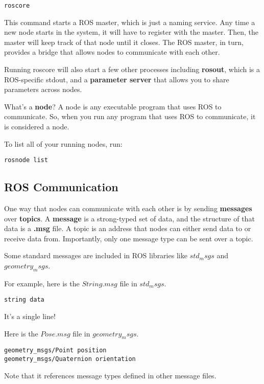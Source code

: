 \begin{lstlisting}
roscore
\end{lstlisting}
This command starts a ROS master, which is just a naming service. Any time a new node starts in the system, it will have to register with the master. Then, the master will keep track of that node until it closes. The ROS master, in turn, provides a bridge that allows nodes to communicate with each other.

Running roscore will also start a few other processes including \textbf{rosout}, which is a ROS-specific stdout, and a \textbf{parameter server} that allows you to share parameters across nodes.   

What's a \textbf{node}? A node is any executable program that uses ROS to communicate. So, when you run any program that uses ROS to communicate, it is considered a node.

To list all of your running nodes, run:

\begin{lstlisting}
rosnode list
\end{lstlisting}

\subsection{ROS Communication}
One way that nodes can communicate with each other is by sending \textbf{messages} over \textbf{topics}. A \textbf{message} is a strong-typed set of data, and the structure of that data is a \textbf{.msg} file. A topic is an address that nodes can either send data to or receive data from. Importantly, only one message type can be sent over a topic. 

Some standard messages are included in ROS libraries like $std_msgs$ and $geometry_msgs$.

For example, here is the $String.msg$ file in $std_msgs$.

\begin{lstlisting}
string data
\end{lstlisting}


It's a single line!

Here is the $Pose.msg$ file in $geometry_msgs$.


\begin{lstlisting}
geometry_msgs/Point position
geometry_msgs/Quaternion orientation
\end{lstlisting}

Note that it references message types defined in other message files.

